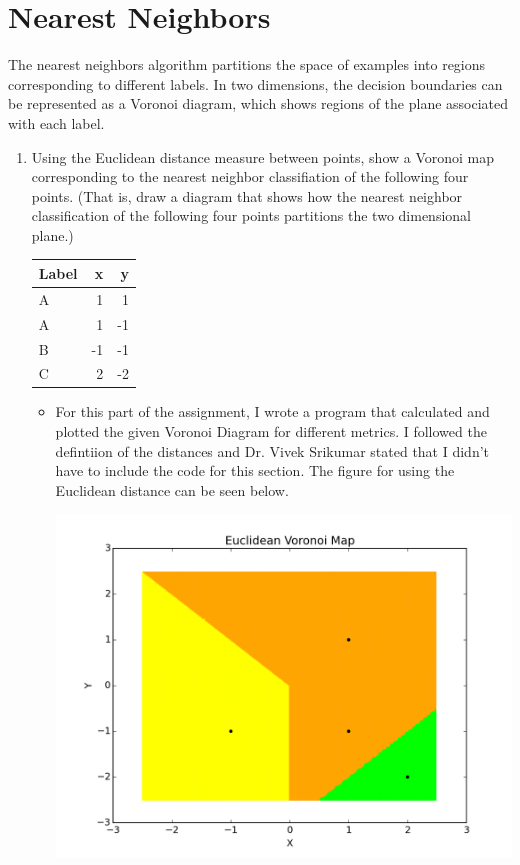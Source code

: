 \documentclass[listings, listings-bw, listings-color, listings-sv]{article}
\begin{document}
\section{Nearest Neighbors}
\label{sec-2}

The nearest neighbors algorithm partitions the space of examples into regions corresponding to  different  labels.   In  two  dimensions,  the  decision  boundaries  can  be  represented  as  a Voronoi diagram, which shows regions of the plane associated with each label.
\begin{enumerate}
\item Using the Euclidean distance measure between points, show a Voronoi map corresponding to the nearest neighbor classifiation of the following four points.  (That is, draw a diagram that shows how the nearest neighbor classification of the following four points partitions the two dimensional plane.)

\begin{center}
\begin{tabular}{lrr}
\hline
Label & x & y\\
\hline
A & 1 & 1\\
A & 1 & -1\\
B & -1 & -1\\
C & 2 & -2\\
\hline
\end{tabular}
\end{center}

\begin{itemize}
\item For this part of the assignment, I wrote a program that calculated and plotted the given Voronoi Diagram for different metrics. I followed the defintiion of the distances and Dr. Vivek Srikumar stated that I didn't have to include the code for this section.  The figure for using the Euclidean distance can be seen below.

\includegraphics[height=8 cm \centering]{./images/NN_3a.png}
\end{itemize}
\end{enumerate}
\end{document}
